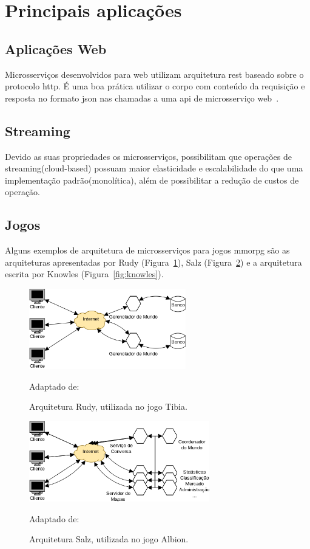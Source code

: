\section{Principais aplicações}

\subsection{Aplicações Web}

Microsserviços desenvolvidos para web utilizam arquitetura \ac{rest} baseado sobre o protocolo \ac{http}.
É uma boa prática utilizar o corpo com conteúdo da requisição e resposta no formato \ac{json} nas chamadas a uma \ac{api} de microsserviço web~\cite{Nadareishvili2016Aug}.

\subsection{Streaming}
Devido as suas propriedades os microsserviços, possibilitam que operações de streaming(cloud-based) possuam maior elasticidade e escalabilidade do que uma implementação padrão(monolítica), além de possibilitar a redução de custos de operação.\cite{microservicosStreaming}
\subsection{Jogos}

Alguns exemplos de arquitetura de microsserviços para jogos \ac{mmorpg} são as arquiteturas apresentadas por Rudy (Figura~\ref{fig:rudy}), Salz (Figura~\ref{fig:salz}) e a arquitetura escrita por Knowles (Figura~\ref{fig:knowles}).


\begin{figure}[htb!]
  \caption{Arquitetura Rudy, utilizada no jogo Tibia.}
  \label{fig:rudy}
  \includegraphics[height=3.5cm]{arquiteturas/rudy.png}
  \centering

  Adaptado de:~\cite{matthiasrudy2011}
\end{figure}


\begin{figure}[htb!]
  \caption{Arquitetura Salz, utilizada no jogo Albion.}
  \label{fig:salz}
  \includegraphics[height=3.5cm]{arquiteturas/salz.png}
  \centering

  Adaptado de:~\cite{albion_online_unite}
\end{figure}%

